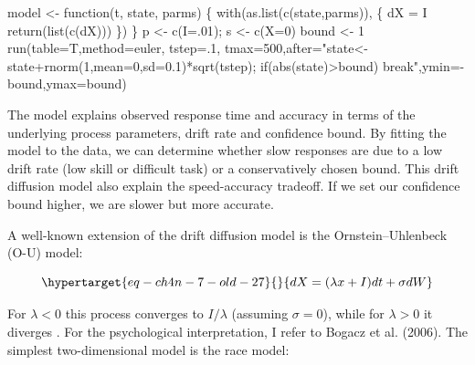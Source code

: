\documentclass[
  a4paper,
  DIV=11,
  numbers=noendperiod,
  oneside]{scrreprt}
\newenvironment{Shaded}{\begin{snugshade}}{\end{snugshade}}
\newcommand{\AttributeTok}[1]{\textcolor[rgb]{0.40,0.45,0.13}{#1}}
\newcommand{\ControlFlowTok}[1]{\textcolor[rgb]{0.00,0.23,0.31}{#1}}
\newcommand{\DecValTok}[1]{\textcolor[rgb]{0.68,0.00,0.00}{#1}}
\newcommand{\FunctionTok}[1]{\textcolor[rgb]{0.28,0.35,0.67}{#1}}
\newcommand{\NormalTok}[1]{\textcolor[rgb]{0.00,0.23,0.31}{#1}}
\newcommand{\OtherTok}[1]{\textcolor[rgb]{0.00,0.23,0.31}{#1}}
\newcommand{\SpecialCharTok}[1]{\textcolor[rgb]{0.37,0.37,0.37}{#1}}
\newcommand{\StringTok}[1]{\textcolor[rgb]{0.13,0.47,0.30}{#1}}
\begin{document}
\begin{Shaded}
\begin{Highlighting}[]
\NormalTok{model }\OtherTok{\textless{}{-}} \ControlFlowTok{function}\NormalTok{(t, state, parms) \{}
  \FunctionTok{with}\NormalTok{(}\FunctionTok{as.list}\NormalTok{(}\FunctionTok{c}\NormalTok{(state,parms)), \{}
\NormalTok{    dX }\OtherTok{=}\NormalTok{ I}
    \FunctionTok{return}\NormalTok{(}\FunctionTok{list}\NormalTok{(}\FunctionTok{c}\NormalTok{(dX)))}
\NormalTok{  \})}
\NormalTok{\}}
\NormalTok{p }\OtherTok{\textless{}{-}} \FunctionTok{c}\NormalTok{(}\AttributeTok{I=}\NormalTok{.}\DecValTok{01}\NormalTok{); s }\OtherTok{\textless{}{-}} \FunctionTok{c}\NormalTok{(}\AttributeTok{X=}\DecValTok{0}\NormalTok{)}
\NormalTok{bound }\OtherTok{\textless{}{-}} \DecValTok{1}
\FunctionTok{run}\NormalTok{(}\AttributeTok{table=}\NormalTok{T,}\AttributeTok{method=}\StringTok{\textquotesingle{}euler\textquotesingle{}}\NormalTok{, }\AttributeTok{tstep=}\NormalTok{.}\DecValTok{1}\NormalTok{,}
    \AttributeTok{tmax=}\DecValTok{500}\NormalTok{,}\AttributeTok{after=}\StringTok{"state\textless{}{-}state+rnorm(1,mean=0,sd=0.1)*sqrt(tstep);}
\StringTok{    if(abs(state)\textgreater{}bound) break"}\NormalTok{,}\AttributeTok{ymin=}\SpecialCharTok{{-}}\NormalTok{bound,}\AttributeTok{ymax=}\NormalTok{bound)}
\end{Highlighting}
\end{Shaded}

The model explains observed response time and accuracy in terms of the
underlying process parameters, drift rate and confidence bound. By
fitting the model to the data, we can determine whether slow responses
are due to a low drift rate (low skill or difficult task) or a
conservatively chosen bound. This drift diffusion model also explain the
speed-accuracy tradeoff. If we set our confidence bound higher, we are
slower but more accurate.

A well-known extension of the drift diffusion model is the
Ornstein--Uhlenbeck (O-U) model:

\begin{equation}\protect\hypertarget{eq-ch4n-7-old-27}{}{
dX = (\lambda x + I)dt + \sigma dW
}\label{eq-ch4n-7-old-27}\end{equation}

For \(\lambda < 0\) this process converges to \(I/\lambda\) (assuming
\(\sigma = 0\)), while for \(\lambda > 0\) it diverges \(.\) For the
psychological interpretation, I refer to Bogacz et al. (2006). The
simplest two-dimensional model is the race model:
\end{document}
